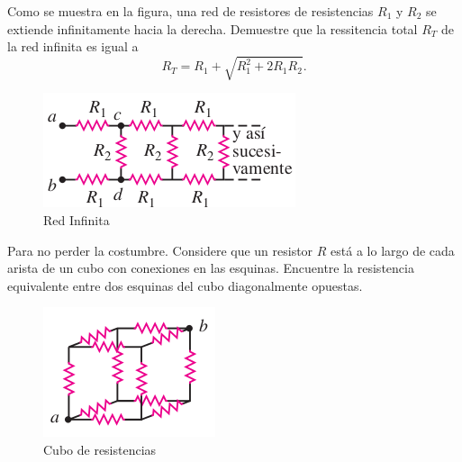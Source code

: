 \begin{mdframed}[style=warning]
	\begin{ejercicio}
		Como se muestra en la figura, una red de resistores de resistencias $R_1$ y $R_2$ se extiende infinitamente hacia la derecha. Demuestre que la ressitencia total $R_T$ de la red infinita es igual a
			$$ R_T = R_1 + \sqrt{R_1 ^2 + 2R_1 R_2}. $$
			
		\begin{figure}[H]
			\centering
			\includegraphics[scale=0.5]{./img/redinfinita.png}
			\caption{Red Infinita}
			\label{Red}
		\end{figure}
	\end{ejercicio}
\end{mdframed}






\begin{mdframed}[style=warning]
	\begin{ejercicio}
		Para no perder la costumbre. Considere que un resistor $R$ está a lo largo de cada arista de un cubo con conexiones en las esquinas. Encuentre la resistencia equivalente entre dos esquinas del cubo diagonalmente opuestas.
		\begin{figure}[H]
			\centering
			\includegraphics[scale=0.5]{./img/cubito.png}
			\caption{Cubo de resistencias}
			\label{cubito}
		\end{figure}
	\end{ejercicio}
\end{mdframed}







